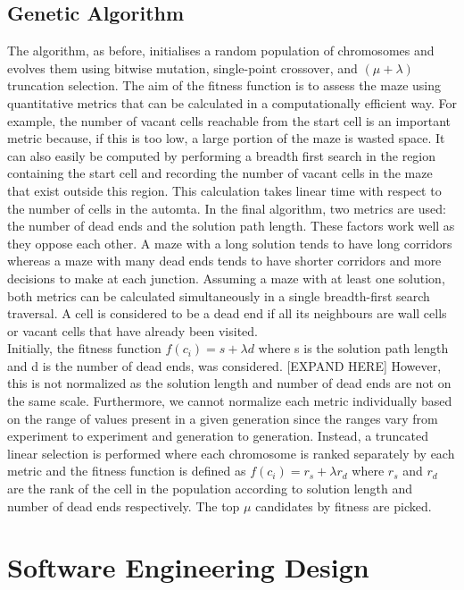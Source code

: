 \subsection{Genetic Algorithm}

The algorithm, as before, initialises a random population of chromosomes and evolves them using bitwise mutation, single-point crossover, and $(\mu + \lambda)$ truncation selection. The aim of the fitness function is to assess the maze using quantitative metrics that can be calculated in a computationally efficient way. For example, the number of vacant cells reachable from the start cell is an important metric because, if this is too low, a large portion of the maze is wasted space. It can also easily be computed by performing a breadth first search in the region containing the start cell and recording the number of vacant cells in the maze that exist outside this region. This calculation takes linear time with respect to the number of cells in the automta. In the final algorithm, two metrics are used: the number of dead ends and the solution path length. These factors work well as they oppose each other. A maze with a long solution tends to have long corridors whereas a maze with many dead ends tends to have shorter corridors and more decisions to make at each junction. Assuming a maze with at least one solution, both metrics can be calculated simultaneously in a single breadth-first search traversal. A cell is considered to be a dead end if all its neighbours are wall cells or vacant cells that have already been visited.\\

Initially, the fitness function $f(c_i) = s + \lambda d$ where s is the solution path length and d is the number of dead ends, was considered. 
[EXPAND HERE]
However, this is not normalized as the solution length and number of dead ends are not on the same scale. Furthermore, we cannot normalize each metric individually based on the range of values present in a given generation since the ranges vary from experiment to experiment and generation to generation. Instead, a truncated linear selection is performed where each chromosome is ranked separately by each metric and the fitness function is defined as $f(c_i) = r_s + \lambda r_d$ where $r_s$ and $r_d$ are the rank of the cell in the population according to solution length and number of dead ends respectively. The top $\mu$ candidates by fitness are picked.

\section{Software Engineering Design}

